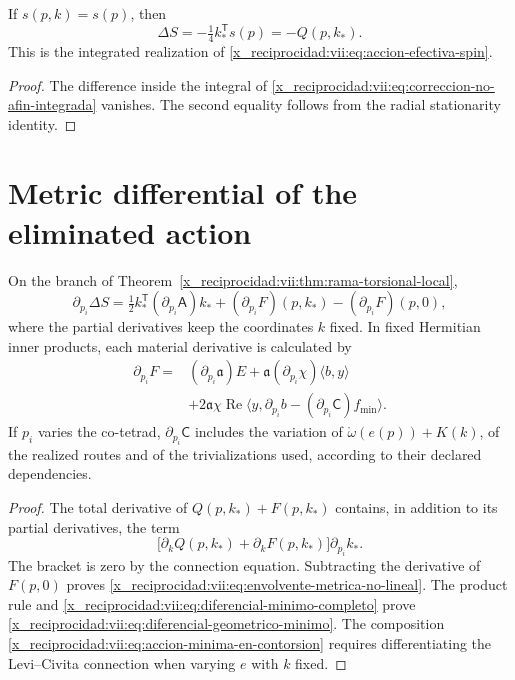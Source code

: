 \begin{corollary}
\label{x_reciprocidad:vii:cor:recuperacion-eliminacion-afin}
If \(s(p,k)=s(p)\), then
\[
 \Delta S=-\tfrac14 k_*^{\mathsf T}s(p)=-Q(p,k_*).
\]
This is the integrated realization of
\eqref{x_reciprocidad:vii:eq:accion-efectiva-spin}.
\end{corollary}
\begin{proof}
The difference inside the integral of
\eqref{x_reciprocidad:vii:eq:correccion-no-afin-integrada} vanishes. The second
equality follows from the radial stationarity identity.
\end{proof}

\section{Metric differential of the eliminated action}
\label{x_reciprocidad:vii:subsec:diferencial-metrico-no-lineal}

\begin{theorem}
\label{x_reciprocidad:vii:thm:envolvente-metrica}
On the branch of Theorem~\ref{x_reciprocidad:vii:thm:rama-torsional-local},
\begin{equation}
 \partial_{p_i}\Delta S
 =\tfrac12 k_*^{\mathsf T}(\partial_{p_i}\mathsf A)k_*
  +(\partial_{p_i}F)(p,k_*)-(\partial_{p_i}F)(p,0),
 \label{x_reciprocidad:vii:eq:envolvente-metrica-no-lineal}
\end{equation}
where the partial derivatives keep the coordinates \(k\) fixed.
In fixed Hermitian inner products, each material derivative is calculated by
\begin{equation}
 \begin{split}
 \partial_{p_i}F={}&(\partial_{p_i}\mathfrak a)E
       +\mathfrak a(\partial_{p_i}\chi)\langle b,y\rangle\\
   &+2\mathfrak a\chi\operatorname{Re}
       \langle y,\partial_{p_i}b
                    -(\partial_{p_i}\mathsf C)f_{\min}\rangle.
 \end{split}
 \label{x_reciprocidad:vii:eq:diferencial-geometrico-minimo}
\end{equation}
If \(p_i\) varies the co-tetrad, \(\partial_{p_i}\mathsf C\)
includes the variation of
\(\mathring\omega(e(p))+K(k)\), of the realized routes and of
the trivializations used, according to their declared dependencies.
\end{theorem}

\begin{proof}
The total derivative of \(Q(p,k_*)+F(p,k_*)\) contains, in
addition to its partial derivatives, the term
\[
 \bigl[\partial_kQ(p,k_*)+\partial_kF(p,k_*)\bigr]
                      \partial_{p_i}k_*.
\]
The bracket is zero by the connection equation. Subtracting the derivative
of \(F(p,0)\) proves
\eqref{x_reciprocidad:vii:eq:envolvente-metrica-no-lineal}.
The product rule and
\eqref{x_reciprocidad:vii:eq:diferencial-minimo-completo} prove
\eqref{x_reciprocidad:vii:eq:diferencial-geometrico-minimo}. The composition
\eqref{x_reciprocidad:vii:eq:accion-minima-en-contorsion} requires differentiating
the Levi--Civita connection when varying \(e\) with \(k\) fixed.
\end{proof}

